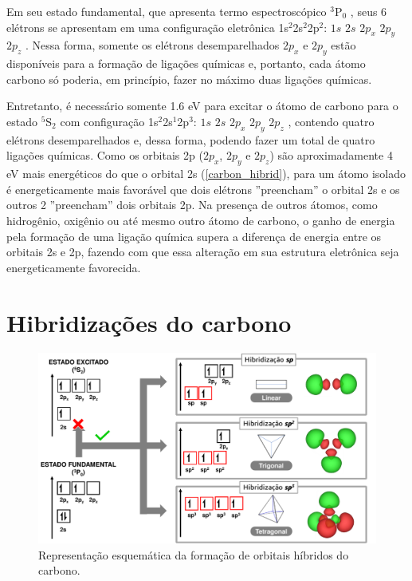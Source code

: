 	Em seu estado fundamental, que apresenta termo espectroscópico $^3$P$_0$ \cite{johansson1966spectrum}, seus 6 elétrons se apresentam em uma configuração eletrônica 1s$^2$2s$^2$2p$^2$: $1s$ \framebox[.25in]{$\upharpoonleft \downharpoonright$} $2s$ \framebox[.25in]{$\upharpoonleft \downharpoonright$}  $2p_x$ \framebox[.25in]{$\upharpoonleft$} $2p_y$ \framebox[.25in]{$\upharpoonleft$} $2p_z$ \framebox[.25in]{\color{white}$\upharpoonleft$}. Nessa forma, somente os elétrons desemparelhados $2p_x$ e $2p_y$ estão disponíveis para a formação de ligações químicas e, portanto, cada átomo carbono só poderia, em princípio, fazer no máximo duas ligações químicas. 
	
	Entretanto, é necessário somente 1.6 eV para excitar o átomo de carbono para o estado $^5$S$_2$ com configuração 1s$^2$2s$^1$2p$^3$:  $1s$ \framebox[.25in]{$\upharpoonleft \downharpoonright$} $2s$ \framebox[.25in]{$\upharpoonleft$}  $2p_x$ \framebox[.25in]{$\upharpoonleft$} $2p_y$ \framebox[.25in]{$\upharpoonleft$} $2p_z$ \framebox[.25in]{$\upharpoonleft$}, contendo quatro elétrons desemparelhados e, dessa forma, podendo fazer um total de quatro ligações químicas. Como os orbitais 2p ($2p_x$, $2p_y$ e $2p_z$) são aproximadamente 4 eV mais energéticos do que o orbital 2s (\autoref{carbon_hibrid}), para um átomo isolado é energeticamente mais favorável que dois elétrons ''preencham'' o orbital 2s e os outros 2 ''preencham'' dois orbitais 2p. Na presença de outros átomos, como hidrogênio, oxigênio ou até mesmo outro átomo de carbono, o ganho de energia pela formação de uma ligação química supera a diferença de energia entre os orbitais 2s e 2p, fazendo com que essa alteração em sua estrutura eletrônica seja energeticamente favorecida. 

	
	\section{Hibridizações do carbono}
	
		
	\begin{figure}[!h]
		\centering
		\includegraphics[width=1.\linewidth]{capitulos/fig/intro/hibrid_carbon.pdf}
		\caption{Representação esquemática da formação de orbitais híbridos do carbono.}
		\label{carbon_hibrid}
	\end{figure}

